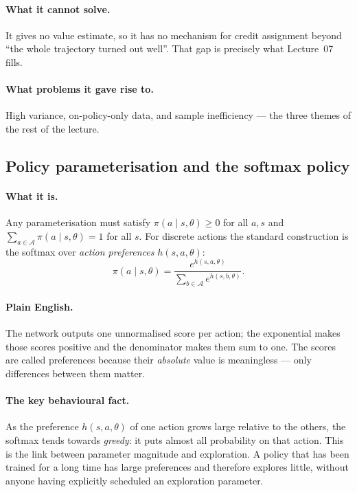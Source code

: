 \documentclass[11pt,a4paper]{article}
\begin{document}
\paragraph{What it cannot solve.} It gives no value estimate, so it has no
mechanism for credit assignment beyond ``the whole trajectory turned out
well''. That gap is precisely what Lecture~07 fills.

\paragraph{What problems it gave rise to.} High variance, on-policy-only data,
and sample inefficiency --- the three themes of the rest of the lecture.

\subsection{Policy parameterisation and the softmax policy}

\paragraph{What it is.} Any parameterisation must satisfy
$\pi(a\mid s,\theta)\ge 0$ for all $a,s$ and $\sum_{a\in\mathcal A}\pi(a\mid s,\theta)=1$
for all $s$. For discrete actions the standard construction is the softmax
over \emph{action preferences} $h(s,a,\theta)$:
\[
\pi(a\mid s,\theta)=\frac{e^{h(s,a,\theta)}}{\sum_{b\in\mathcal A}e^{h(s,b,\theta)}}.
\]

\paragraph{Plain English.} The network outputs one unnormalised score per
action; the exponential makes those scores positive and the denominator makes
them sum to one. The scores are called preferences because their
\emph{absolute} value is meaningless --- only differences between them matter.

\paragraph{The key behavioural fact.} As the preference $h(s,a,\theta)$ of one
action grows large relative to the others, the softmax tends towards
\emph{greedy}: it puts almost all probability on that action. This is the
link between parameter magnitude and exploration. A policy that has been
trained for a long time has large preferences and therefore explores little,
without anyone having explicitly scheduled an exploration parameter.
\end{document}
